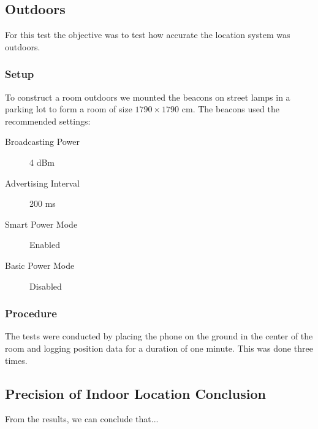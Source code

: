 \subsection{Outdoors}
For this test the objective was to test how accurate the location system was outdoors.

\subsubsection*{Setup}
To construct a room outdoors we mounted the beacons on street lamps in a parking lot to form a room of size $1790\times 1790$ cm. The beacons used the recommended settings\cite{estimote:settings}:
\begin{description}
    \item[Broadcasting Power]{4 dBm}
    \item[Advertising Interval]{200 ms}
    \item[Smart Power Mode]{Enabled}
    \item[Basic Power Mode]{Disabled}
\end{description}

\subsubsection*{Procedure}
The tests were conducted by placing the phone on the ground in the center of the room and logging position data for a duration of one minute.
This was done three times.

\subsection{Precision of Indoor Location Conclusion}
From the results, we can conclude that... 

